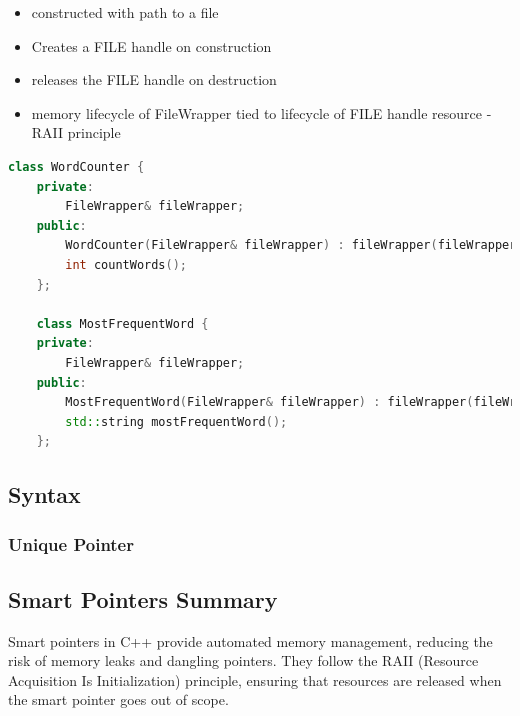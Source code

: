 \documentclass{report}
\begin{document}
\begin{itemize}
	\item constructed with path to a file
	\item Creates a FILE handle on construction
	\item releases the FILE handle on destruction
	\item memory lifecycle of FileWrapper tied to lifecycle of FILE handle resource - RAII principle
\end{itemize}

\begin{lstlisting}[language=C++]
	class WordCounter {
	private:
		FileWrapper& fileWrapper;
	public:
		WordCounter(FileWrapper& fileWrapper) : fileWrapper(fileWrapper) {}
		int countWords();
	};

	class MostFrequentWord {
	private:
		FileWrapper& fileWrapper;
	public:
		MostFrequentWord(FileWrapper& fileWrapper) : fileWrapper(fileWrapper) {}
		std::string mostFrequentWord();
	};
\end{lstlisting}

\subsection{Syntax}

\subsubsection{Unique Pointer}
\subsection{Smart Pointers Summary}

Smart pointers in C++ provide automated memory management, reducing the risk of memory leaks and dangling pointers. They follow the RAII (Resource Acquisition Is Initialization) principle, ensuring that resources are released when the smart pointer goes out of scope.
\end{document}
